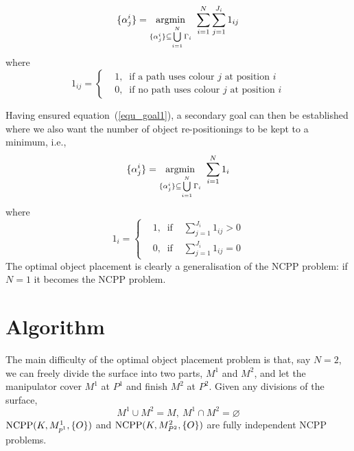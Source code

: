\documentclass[letterpaper, 10pt, conference]{ieeeconf}
\begin{document}
\begin{equation}\label{equ_goal1}
\{\alpha_j^i\} = \mathop{{\rm argmin}}\limits_{\{\alpha_j^i\}\subseteq \bigcup\limits_{i = 1}^N \Gamma_i}~\sum\limits_{i=1}^N\sum\limits_{j = 1}^{J_i} 1_{ij}
\end{equation}
where 
\begin{equation}
1_{ij} = \left\{
\begin{aligned}
&1,\ \mbox{ if a path uses colour }j \mbox{ at position }i\\
&0,\ \mbox{ if no path uses colour }j \mbox{ at position }i 
\end{aligned}
\right.
\end{equation}

Having ensured equation~(\ref{equ_goal1}), a secondary goal can then be established  where we also want the number of object re-positionings to be kept to a minimum, i.e., 
\begin{equation}
\{\alpha_j^i\} = \mathop{{\rm argmin}}\limits_{\{\alpha_j^i\}\subseteq \bigcup\limits_{i = 1}^N \Gamma_i}~\sum\limits_{i=1}^N 1_{i}
\end{equation}
where
\begin{equation}
1_i = \left\{
\begin{aligned}
&1,\ \mbox{ if } &\sum\limits_{j = 1}^{J_i}1_{ij} > 0\\
&0,\ \mbox{ if } &\sum\limits_{j = 1}^{J_i}1_{ij} = 0
\end{aligned}
\right.
\end{equation}
The optimal object placement is clearly a generalisation of the NCPP problem: if $N = 1$ it becomes the NCPP problem. 

\section{Algorithm}
\label{sectionalgorithm}
The main difficulty of the optimal object placement problem is that, say $N = 2$, we can freely divide the surface into two parts, $M^1$ and $M^2$, and let the manipulator cover $M^1$ at $P^1$ and finish $M^2$ at $P^2$. 
Given any divisions of the surface, 
\begin{equation}
M^1\cup M^2 = M,~M^1\cap M^2 = \varnothing
\end{equation}
${\rm NCPP}(K, M^1_{p^1}, \{O\})$ and ${\rm NCPP}(K, M^2_{P^2}, \{O\})$ are fully independent NCPP problems. 
\end{document}

